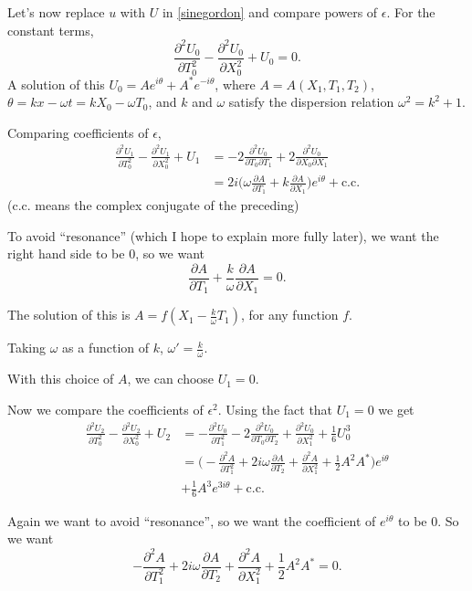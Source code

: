 \documentclass[11pt]{article}
\begin{document}
Let's now replace $u$ with $U$ in \eqref{sinegordon} and compare powers of $\epsilon$. For the constant terms,
\[
\frac{\partial^2 U_0}{\partial T_0^2}-\frac{\partial^2 U_0}{\partial X_0^2}+U_0=0.
\]
A solution of this $U_0=Ae^{i\theta}+A^* e^{-i\theta}$, where $A=A(X_1,T_1,T_2)$,
$\theta=kx-\omega t=kX_0-\omega T_0$, and $k$ and $\omega$ satisfy the dispersion relation
$\omega^2=k^2+1$.

Comparing coefficients of $\epsilon$,
\begin{align*}
\frac{\partial^2 U_1}{\partial T_0^2}-\frac{\partial^2 U_1}{\partial X_0^2}
+U_1&=-2\frac{\partial^2 U_0}{\partial T_0 \partial T_1}
+2 \frac{\partial^2 U_0}{\partial X_0 \partial X_1}\\
&=2i\Big( \omega \frac{\partial A}{\partial T_1}+k \frac{\partial A}{\partial X_1}\Big) e^{i\theta}
+\textrm{c.c.}
\end{align*}
(c.c. means the complex conjugate of the preceding)

To avoid ``resonance'' (which I hope to explain more fully later), we want the right hand side to be 0, so we want
\[
\frac{\partial A}{\partial T_1}+\frac{k}{\omega} \frac{\partial A}{\partial X_1}=0.
\]

The solution of this is $A=f(X_1-\frac{k}{\omega} T_1)$, for any function $f$.

Taking $\omega$ as a function of $k$, $\omega'=\frac{k}{\omega}$.

With this choice of $A$, we can choose $U_1=0$.

Now we compare the coefficients of $\epsilon^2$. Using the fact that $U_1=0$ we get
\begin{align*}
\frac{\partial^2 U_2}{\partial T_0^2}-\frac{\partial^2 U_2}{\partial X_0^2}
+U_2&=-\frac{\partial^2 U_0}{\partial T_1^2}-2\frac{\partial^2 U_0}{\partial T_0 \partial T_2}
+\frac{\partial^2 U_0}{\partial X_1^2}+\frac{1}{6}U_0^3\\
&=\Big(-\frac{\partial^2 A}{\partial T_1^2}+2i\omega \frac{\partial A}{\partial T_2}
+\frac{\partial^2 A}{\partial X_1^2}+\frac{1}{2}A^2 A^*\Big) e^{i\theta}\\
&+\frac{1}{6}A^3 e^{3i\theta}+\textrm{c.c.}
\end{align*}

Again we want to avoid ``resonance'', so we want the coefficient of $e^{i\theta}$ to be 0. So we want
\[
-\frac{\partial^2 A}{\partial T_1^2}+2i\omega \frac{\partial A}{\partial T_2}
+\frac{\partial^2 A}{\partial X_1^2}+\frac{1}{2}A^2 A^*=0.
\]
\end{document}
